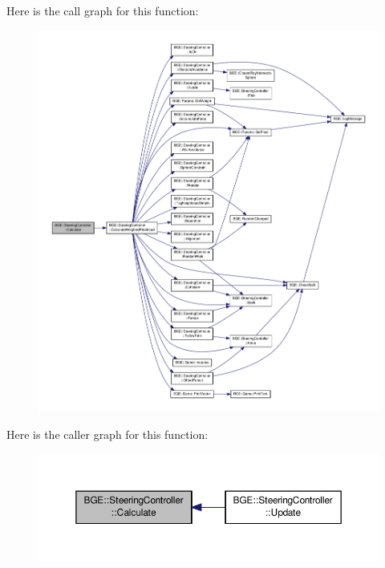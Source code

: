 Here is the call graph for this function\-:
\nopagebreak
\begin{figure}[H]
\begin{center}
\leavevmode
\includegraphics[width=350pt]{class_b_g_e_1_1_steering_controller_a83fd612fb65fe1ef6be18c4dfd09ceed_cgraph}
\end{center}
\end{figure}




Here is the caller graph for this function\-:
\nopagebreak
\begin{figure}[H]
\begin{center}
\leavevmode
\includegraphics[width=350pt]{class_b_g_e_1_1_steering_controller_a83fd612fb65fe1ef6be18c4dfd09ceed_icgraph}
\end{center}
\end{figure}


